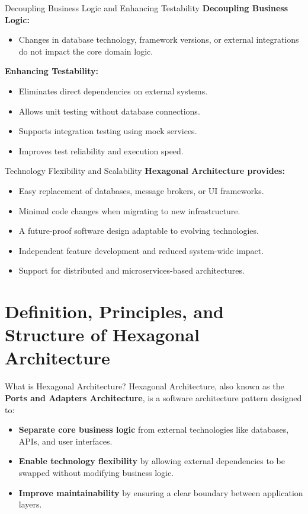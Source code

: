 \documentclass[aspectratio=169, table]{beamer}
\begin{document}
\begin{frame}[fragile]{\Large{Decoupling Business Logic and Enhancing Testability}}
	\vspace{20pt}
	\textbf{Decoupling Business Logic:}
	\begin{itemize}
		\item Changes in database technology, framework versions, or external integrations do not impact the core domain logic.
	\end{itemize}
	
	\textbf{Enhancing Testability:}
	\begin{itemize}
		\item Eliminates direct dependencies on external systems.
		\item Allows unit testing without database connections.
		\item Supports integration testing using mock services.
		\item Improves test reliability and execution speed.
	\end{itemize}
\end{frame}

\begin{frame}[fragile]{Technology Flexibility and Scalability}
	\vspace{20pt}
	\textbf{Hexagonal Architecture provides:}
	\begin{itemize}
		\item Easy replacement of databases, message brokers, or UI frameworks.
		\item Minimal code changes when migrating to new infrastructure.
		\item A future-proof software design adaptable to evolving technologies.
		\item Independent feature development and reduced system-wide impact.
		\item Support for distributed and microservices-based architectures.
	\end{itemize}
\end{frame}


\section{Definition, Principles, and Structure of Hexagonal Architecture}

\begin{frame}[fragile]{What is Hexagonal Architecture?}
	\vspace{20pt}
	Hexagonal Architecture, also known as the \textbf{Ports and Adapters Architecture}, is a software architecture pattern designed to:
	\begin{itemize}
		\item \textbf{Separate core business logic} from external technologies like databases, APIs, and user interfaces.
		\item \textbf{Enable technology flexibility} by allowing external dependencies to be swapped without modifying business logic.
		\item \textbf{Improve maintainability} by ensuring a clear boundary between application layers.
	\end{itemize}
\end{frame}
\end{document}
